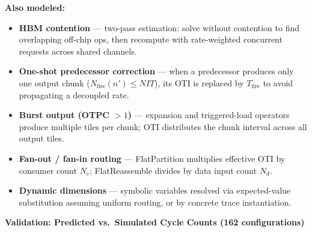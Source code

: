 \documentclass[11pt]{article}
\begin{document}
\medskip

\small
\textbf{Also modeled:}
\begin{itemize}
\setlength{\itemsep}{1pt}\setlength{\parskip}{0pt}
\item \textbf{HBM contention} --- two-pass estimation: solve without contention to find overlapping off-chip ops, then recompute with rate-weighted concurrent requests across shared channels.
\item \textbf{One-shot predecessor correction} --- when a predecessor produces only one output chunk ($N_{\text{fire}}(n') \leq \mathit{NIT}$), its OTI is replaced by $T_{\text{fire}}$ to avoid propagating a decoupled rate.
\item \textbf{Burst output (OTPC $> 1$)} --- expansion and triggered-load operators produce multiple tiles per chunk; OTI distributes the chunk interval across all output tiles.
\item \textbf{Fan-out / fan-in routing} --- FlatPartition multiplies effective OTI by consumer count $N_c$; FlatReassemble divides by data input count $N_d$.
\item \textbf{Dynamic dimensions} --- symbolic variables resolved via expected-value substitution assuming uniform routing, or by concrete trace instantiation.
\end{itemize}

\bigskip

\begin{center}
\normalsize\textbf{Validation: Predicted vs.\ Simulated Cycle Counts (162 configurations)}
\end{center}

\smallskip
\end{document}
